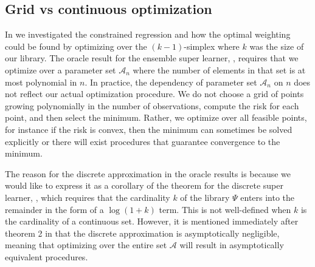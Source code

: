 \documentclass[11pt, a4paper]{article}
\theoremstyle{definition}
\theoremstyle{remark}
\newcommand{\ml}{k}
\newcommand{\lib}{\Psi}
\begin{document}
\subsection{Grid vs continuous optimization} 
In  we investigated the constrained regression and how the optimal weighting could be found by optimizing over the $ (\ml -1) $-simplex where $ \ml $ was the size of our library. The oracle result for the ensemble super learner, , requires that we optimize over a parameter set $ \mathcal{A}_n $ where the number of elements in that set is at most polynomial in $ n $. In practice, the dependency of parameter set $ \mathcal{A}_n $ on $ n $ does not reflect our actual optimization procedure. We do not choose a grid of points growing polynomially in the number of observations, compute the risk for each point, and then select the minimum. Rather, we optimize over all feasible points, for instance if the risk is convex, then the minimum can sometimes be solved explicitly or there will exist procedures that guarantee convergence to the minimum. 

The reason for the discrete approximation in the oracle results is because we would like to express it as a corollary of the theorem for the discrete super learner, , which requires that the cardinality $ k $ of the library $ \lib $ enters into the remainder in the form of a $ \log(1 + k) $ term. This is not well-defined when $ k $ is the cardinality of a continuous set. However, it is mentioned immediately after theorem 2 in \citet{van2007super} that the discrete approximation is asymptotically negligible, meaning that optimizing over the entire set $ \mathcal{A} $ will result in asymptotically equivalent procedures. 
\end{document}
